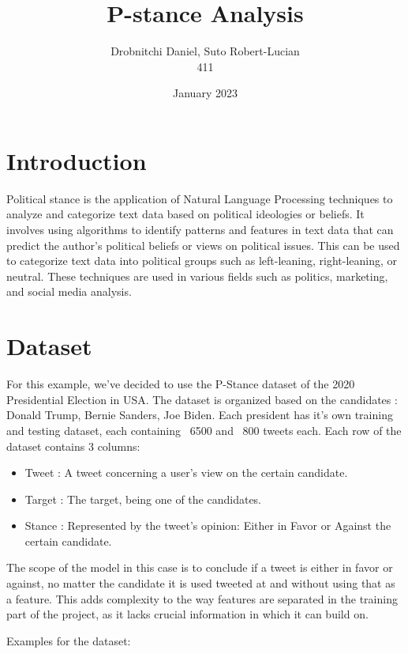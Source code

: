 \documentclass[11pt, a4paper]{article}
\title{P-stance Analysis}
\author{ Drobnitchi Daniel, Suto Robert-Lucian \\411}
\date{January 2023}
\begin{document}
\maketitle
\begin{large}

\section{Introduction}
Political stance is the application of Natural Language Processing techniques to analyze and categorize text data based on political ideologies or beliefs. It involves using algorithms to identify patterns and features in text data that can predict the author's political beliefs or views on political issues. This can be used to categorize text data into political groups such as left-leaning, right-leaning, or neutral. These techniques are used in various fields such as politics, marketing, and social media analysis.

\section{Dataset}

For this example, we've decided to use the P-Stance dataset of the 2020 Presidential Election in USA. The dataset is organized based on the candidates : Donald Trump, Bernie Sanders, Joe Biden. Each president has it's own training and testing dataset, each containing ~6500 and ~800 tweets each. Each row of the dataset contains 3 columns: 
\begin{itemize}
    \item Tweet : A tweet concerning a user's view on the certain candidate.
    \item Target : The target, being one of the candidates.
    \item Stance : Represented by the tweet's opinion: Either in Favor or Against the certain candidate.
\end{itemize}
\newpage

The scope of the model in this case is to conclude if a tweet is either in favor or against, no matter the candidate it is used tweeted at and without using that as a feature. This adds complexity to the way features are separated in the training part of the project, as it lacks crucial information in which it can build on.

Examples for the dataset:


\end{large}
\end{document}

